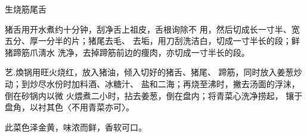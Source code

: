 \begin{recipe}{生烧筋尾舌}

\ingredients


\cooking

\step 猪舌用开水煮约十分钟，刮净舌上祖皮，舌根询除不 用，然后切成长一寸半、宽五分、厚一分半的片；猪尾去毛、 去垢，用刀刮洗洁白，切成一寸半长的段；鲜猪蹄筋爪淸水 洗净，去掉蹄筋前边的痩肉，亦切成一寸半长的段。

艺.煥锅用旺火烧红，放入猪油，倾入切好的猪舌、猪尾、 蹄筋，同时放入姜葱炒动；到炒尽水份时加料酒、冰糖汁、 盐和二海；再烧至沸时，撇去汤面的浮沫，倒在砂锅内以微 火煨煮二小时，拈去姜葱，倒在盘内；将青菜心洗净捞起， 镶于盘角，以衬其色〈不用青菜亦可〉。

\notes

此菜色泽金黄，味浓而鲜，香软可口。

\end{recipe}

